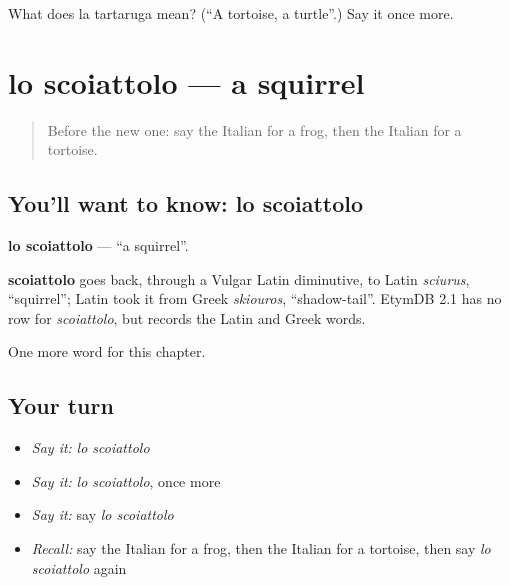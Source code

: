 \begin{tcolorbox}[breakable,colback=teal!4,colframe=teal!35!black,title={Before you move on}]
What does la tartaruga mean? (\textquotedblleft{}A tortoise, a turtle\textquotedblright{}.) Say it once more.
\end{tcolorbox}
\section[lo scoiattolo]{lo scoiattolo — a squirrel}

\label{lesson:IT-C121-scoiattolo}



\begin{quote}
Before the new one: say the Italian for a frog, then the Italian for a tortoise.
\end{quote}

\subsection*{You'll want to know: lo scoiattolo}
\textbf{lo scoiattolo} — \textquotedblleft{}a squirrel\textquotedblright{}.

\begin{cousinweb}
\textbf{scoiattolo} goes back, through a Vulgar Latin diminutive, to Latin \emph{sciurus}, \textquotedblleft{}squirrel\textquotedblright{}; Latin took it from Greek \emph{skiouros}, \textquotedblleft{}shadow-tail\textquotedblright{}. EtymDB 2.1 has no row for \emph{scoiattolo}, but records the Latin and Greek words.
\end{cousinweb}

\begin{grammarlens}[title={What you've built}]
One more word for this chapter.
\end{grammarlens}

\subsection*{Your turn}
\begin{itemize}
\raggedright
  \item \emph{Say it:} \emph{lo scoiattolo}
  \item \emph{Say it:} \emph{lo scoiattolo}, once more
  \item \emph{Say it:} say \emph{lo scoiattolo}
  \item \emph{Recall:} say the Italian for a frog, then the Italian for a tortoise, then say \emph{lo scoiattolo} again
\end{itemize}

